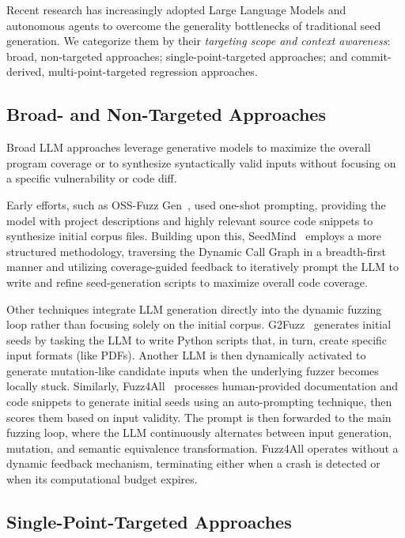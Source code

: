 Recent research has increasingly adopted Large Language Models and autonomous
agents to overcome the generality bottlenecks of traditional seed generation. We
categorize them by their \emph{targeting scope and context awareness}: broad, non-targeted approaches; single-point-targeted approaches; and commit-derived, multi-point-targeted regression approaches.

\subsection{Broad- and Non-Targeted Approaches}
\label{subsec:rw-broad}

Broad \ac{LLM} approaches leverage generative models to maximize the overall program
coverage or to synthesize syntactically valid inputs without focusing on a
specific vulnerability or code diff.

Early efforts, such as OSS-Fuzz
Gen~\cite{OssfuzzgenLlm_toolkitCorpus_generatorpy}, used one-shot prompting,
providing the model with project descriptions and highly relevant source code
snippets to synthesize initial corpus files. Building upon this,
SeedMind~\cite{shiHarnessingLargeLanguage2024} employs a more structured
methodology, traversing the Dynamic Call Graph in a breadth-first manner and
utilizing coverage-guided feedback to iteratively prompt the \ac{LLM} to write
and refine seed-generation scripts to maximize overall code coverage.

Other techniques integrate \ac{LLM} generation directly into the dynamic fuzzing
loop rather than focusing solely on the initial corpus.
G2Fuzz~\cite{EnablingLowCostComprehensive} generates initial seeds by tasking
the \ac{LLM} to write Python scripts that, in turn, create specific input
formats (like PDFs). Another \ac{LLM} is then dynamically activated to generate
mutation-like candidate inputs when the underlying fuzzer becomes locally stuck.
Similarly, Fuzz4All~\cite{xiaFuzz4AllUniversalFuzzing2024} processes
human-provided documentation and code snippets to generate initial seeds using
an auto-prompting technique, then scores them based on input validity. The
prompt is then forwarded to the main fuzzing loop, where the \ac{LLM}
continuously alternates between input generation, mutation, and semantic
equivalence transformation. Fuzz4All operates without a dynamic feedback
mechanism, terminating either when a crash is detected or when its computational
budget expires.

\subsection{Single-Point-Targeted Approaches}
\label{subsec:rw-point-targeted}

